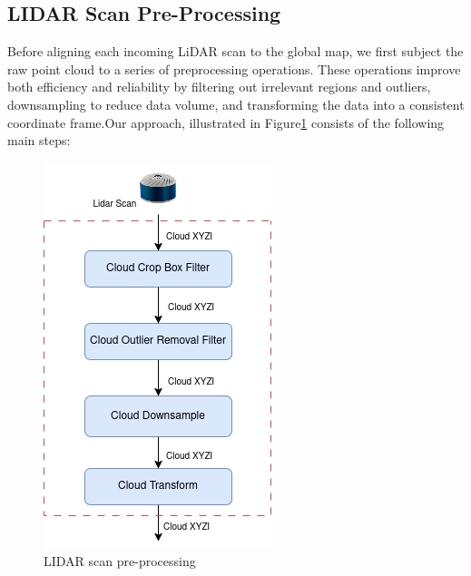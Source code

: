 \subsection{LIDAR Scan Pre-Processing}
Before aligning each incoming LiDAR scan to the global map, we first subject the raw point cloud to a series of preprocessing operations. These operations improve both efficiency and reliability by filtering out irrelevant regions and outliers, downsampling to reduce data volume, and transforming the data into a consistent coordinate frame.Our approach, illustrated in Figure\ref{fig:lidar_scan_preprocessing}  consists of the following  main steps:
\begin{figure}
    \centering
    \includegraphics[width=0.4\linewidth]{images/LIDAR_PreProccess.drawio.png}
    \caption{LIDAR scan pre-processing}
    \label{fig:lidar_scan_preprocessing}
\end{figure}

